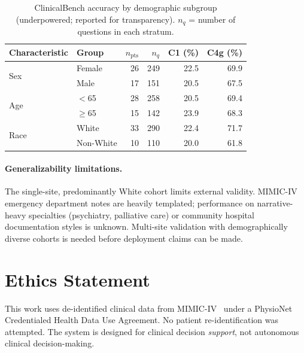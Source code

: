 \begin{table}[ht]
\centering
\footnotesize
\caption{ClinicalBench accuracy by demographic subgroup (underpowered; reported for transparency). $n_q$ = number of questions in each stratum.}
\label{tab:subgroup_accuracy}
\begin{tabular}{@{}llrrrr@{}}
\toprule
Characteristic & Group & $n_{\text{pts}}$ & $n_q$ & C1 (\%) & C4g (\%) \\
\midrule
\multirow{2}{*}{Sex} & Female & 26 & 249 & 22.5 & 69.9 \\
 & Male & 17 & 151 & 20.5 & 67.5 \\
\midrule
\multirow{2}{*}{Age} & $<$65 & 28 & 258 & 20.5 & 69.4 \\
 & $\geq$65 & 15 & 142 & 23.9 & 68.3 \\
\midrule
\multirow{2}{*}{Race} & White & 33 & 290 & 22.4 & 71.7 \\
 & Non-White & 10 & 110 & 20.0 & 61.8 \\
\bottomrule
\end{tabular}
\end{table}

\paragraph{Generalizability limitations.}
The single-site, predominantly White cohort limits external validity.
MIMIC-IV emergency department notes are heavily templated; performance on narrative-heavy specialties (psychiatry, palliative care) or community hospital documentation styles is unknown.
Multi-site validation with demographically diverse cohorts is needed before deployment claims can be made.


\section{Ethics Statement}
\label{app:ethics}

This work uses de-identified clinical data from MIMIC-IV~\cite{johnson2023mimiciv} under a PhysioNet Credentialed Health Data Use Agreement. No patient re-identification was attempted. The system is designed for clinical decision \emph{support}, not autonomous clinical decision-making.
